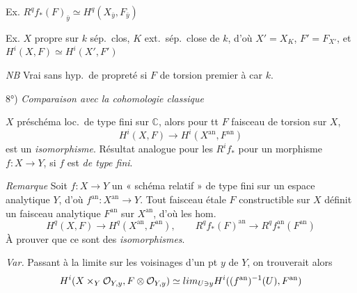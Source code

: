 \documentclass[11pt,a4paper]{article}
\begin{document}
Ex. $R^q f_{*}(F)_{\bar y} \simeq H^q(X_{\bar y}, F_{\bar y})$

Ex. $X$ propre sur $k$ sép.\ clos, $K$ ext.\ sép.\ close de $k$, d'où
$X' = X_{K}$, $F' = F_{X'}$, et $H^i(X, F) \simeq H^i(X', F')$

\emph{NB} Vrai sans hyp.\ de propreté si $F$ de torsion premier à
\struck{\ill{}} car $k$.

8°) \emph{Comparaison avec la cohomologie classique}

$X$ préschéma loc.\ de type fini sur $\mathbb{C}$, alors pour tt $F$ faisceau
de torsion sur $X$,
\[
  H^i(X, F) \to H^i(X^{\mathrm{an}}, F^{\mathrm{an}})
\]
est un \emph{isomorphisme}. Résultat analogue pour les $R^i f_{*}$ pour un
morphisme $f : X \to Y$, si $f$ est \emph{de type fini}.




\emph{Remarque} Soit $f : X \to Y$ un « schéma relatif » de type fini sur un
espace analytique $Y$, d'où $f^{\mathrm{an}} : X^{\mathrm{an}} \to Y$. Tout
faisceau étale  $F$ constructible sur $X$ définit un faisceau
analytique $F^{\mathrm{an}}$ sur $X^{\mathrm{an}}$, d'où les hom.
\[
  H^q(X, F) \to H^q(X^{\mathrm{an}}, F^{\mathrm{an}}), \qquad
  R^q f_{*}(F)^{\mathrm{an}} \to R^q f^{\mathrm{an}}_{*}(F^{\mathrm{an}})
\]
À prouver que ce sont des \emph{isomorphismes}.

\emph{Var.} Passant à la limite sur les voisinages d'un pt $y$ de $Y$, on
trouverait alors
\[
  H^i(X \times_{Y} \mathcal{O}_{Y,y}, F \otimes \mathcal{O}_{Y,y})
  \simeq \varinjlim_{U \ni y} H^i((f^{\mathrm{an}})^{-1}(U), F^{\mathrm{an}})
\]
\end{document}
